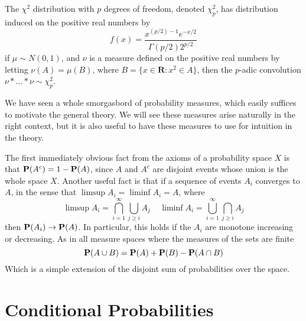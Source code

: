\begin{example}
    The $\chi^2$ distribution with $p$ degrees of freedom, denoted $\chi_p^2$, has distribution induced on the positive real numbers by
    \[ f(x) = \frac{x^{(p/2) - 1} e^{-x/2}}{\Gamma(p/2) 2^{p/2}} \]
    if $\mu \sim N(0, 1)$, and $\nu$ is a measure defined on the positive real numbers by letting $\nu(A) = \mu(B)$, where $B = \{ x \in \mathbf{R}: x^2 \in A \}$, then the $p$-adic convolution $\nu * \dots * \nu \sim \chi_p^2$.
\end{example}

We have seen a whole smorgasbord of probability measures, which easily suffices to motivate the general theory. We will see these measures arise naturally in the right context, but it is also useful to have these measures to use for intuition in the theory.

The first immediately obvious fact from the axioms of a probability space $X$ is that $\operatorname{\mathbf{P}}(A^c) = 1 - \operatorname{\mathbf{P}}(A)$, since $A$ and $A^c$ are disjoint events whose union is the whole space $X$. Another useful fact is that if a sequence of events $A_i$ converges to $A$, in the sense that $\limsup A_i = \liminf A_i = A$, where
%
\[ \limsup A_i = \bigcap_{i = 1}^\infty \bigcup_{j \geq i} A_j\ \ \ \ \ \liminf A_i = \bigcup_{i = 1}^\infty \bigcap_{j \geq i} A_j \]
%
then $\operatorname{\mathbf{P}}(A_i) \to \operatorname{\mathbf{P}}(A)$. In particular, this holds if the $A_i$ are monotone increasing or decreasing. As in all measure spaces where the measures of the sets are finite
%
\[ \operatorname{\mathbf{P}}(A \cup B) = \operatorname{\mathbf{P}}(A) + \operatorname{\mathbf{P}}(B) - \operatorname{\mathbf{P}}(A \cap B) \]
%
Which is a simple extension of the disjoint sum of probabilities over the space.

\section{Conditional Probabilities}

